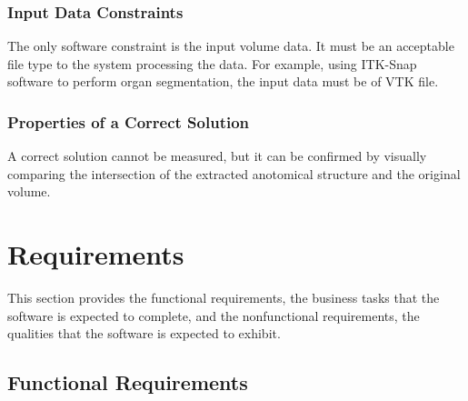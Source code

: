 \documentclass[12pt]{article}
\begin{document}
\subsubsection{Input Data Constraints} \label{sec_DataConstraints}    
The only software constraint is the input volume data. It must be an acceptable file type to the system processing the data. For example, using ITK-Snap software to perform organ segmentation, the input data must be of VTK file.

\subsubsection{Properties of a Correct Solution} \label{sec_CorrectSolution}

\noindent
A correct solution cannot be measured, but it can be confirmed by visually comparing the intersection of the extracted anotomical structure and the original volume.

\section{Requirements}

This section provides the functional requirements, the business tasks that the
software is expected to complete, and the nonfunctional requirements, the
qualities that the software is expected to exhibit.

\subsection{Functional Requirements}
\end{document}
